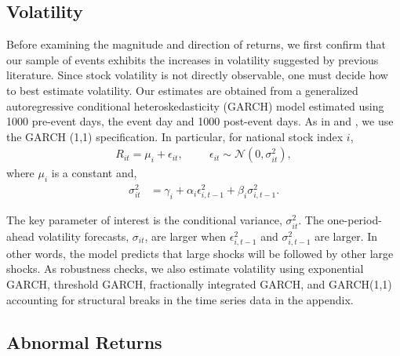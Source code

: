 \documentclass[12pt,final,fleqn]{article}
\theoremstyle{plain}
\begin{document}
\subsection{Volatility} \label{subsec: Volatility_estimation}

Before examining the magnitude and direction of returns, we first confirm that our sample of events exhibits the increases in volatility suggested by previous literature. Since stock volatility is not directly observable, one must decide how to best estimate volatility. Our estimates are obtained from a generalized autoregressive conditional heteroskedasticity (GARCH) model estimated using 1000 pre-event days, the event day and 1000 post-event days. As in \citet{jensen2005market} and \citet{leblang2005government}, we use the GARCH (1,1) specification. In particular, for national stock index $i$,
\begin{align*}
R_{it}=\mu_i + \epsilon_{it},\hspace{1cm} \epsilon_{it}\sim \mathcal{N}\left(0,\sigma_{it}^2\right),
\end{align*}
where $\mu_i$ is a constant and,
\begin{align*}
\sigma_{it}^2&=\gamma_{i}+\alpha_{i}\epsilon_{i,t-1}^2+\beta_{i}\sigma_{i,t-1}^2.
\end{align*}

The key parameter of interest is the conditional variance, $\sigma_{it}^2$. The one-period-ahead volatility forecasts, $\sigma_{it}$, are larger when $\epsilon_{i,t-1}^2$ and $\sigma_{i,t-1}^2$ are larger. In other words, the model predicts that large shocks will be followed by other large shocks. As robustness checks, we also estimate volatility using exponential GARCH, threshold GARCH, fractionally integrated GARCH, and GARCH(1,1) accounting for structural breaks in the time series data in the appendix. 

\subsection{Abnormal Returns} \label{subsec:abnormal-returns_estimation}
\end{document}
